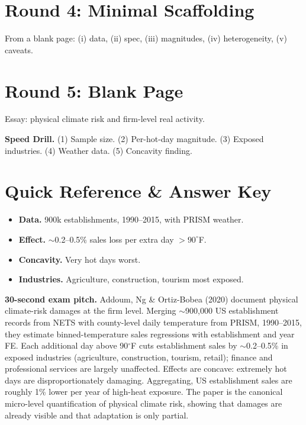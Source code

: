 \documentclass[11pt]{article}
\begin{document}
\section*{Round 4: Minimal Scaffolding}
From a blank page: (i) data, (ii) spec, (iii) magnitudes, (iv) heterogeneity, (v) caveats.

\section*{Round 5: Blank Page}
Essay: physical climate risk and firm-level real activity.

\vspace{6pt}
\begin{drillbox}
\textbf{Speed Drill.} (1) Sample size. (2) Per-hot-day magnitude. (3) Exposed industries. (4) Weather data. (5) Concavity finding.
\end{drillbox}

\section*{Quick Reference \& Answer Key}
\begin{answerbox}
\begin{itemize}
\item \textbf{Data.} 900k establishments, 1990--2015, with PRISM weather.
\item \textbf{Effect.} $\sim$0.2--0.5\% sales loss per extra day $>90^\circ$F.
\item \textbf{Concavity.} Very hot days worst.
\item \textbf{Industries.} Agriculture, construction, tourism most exposed.
\end{itemize}
\end{answerbox}

\begin{keybox}
\textbf{30-second exam pitch.} Addoum, Ng \& Ortiz-Bobea (2020) document physical climate-risk damages at the firm level. Merging $\sim$900{,}000 US establishment records from NETS with county-level daily temperature from PRISM, 1990--2015, they estimate binned-temperature sales regressions with establishment and year FE. Each additional day above 90$^\circ$F cuts establishment sales by $\sim$0.2--0.5\% in exposed industries (agriculture, construction, tourism, retail); finance and professional services are largely unaffected. Effects are concave: extremely hot days are disproportionately damaging. Aggregating, US establishment sales are roughly 1\% lower per year of high-heat exposure. The paper is the canonical micro-level quantification of physical climate risk, showing that damages are already visible and that adaptation is only partial.
\end{keybox}
\end{document}
